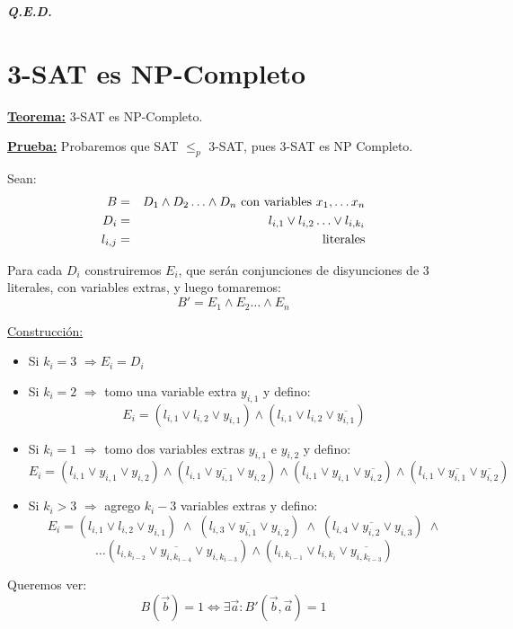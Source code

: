\documentclass[12pt,a4paper]{report}
\newcommand{\QED}{\hfill \textit{\textbf{Q.E.D.}}}
\begin{document}
		\QED

	\section{3-SAT es NP-Completo}
		\textbf{\underline{Teorema:}} 3-SAT es NP-Completo.

		\textbf{\underline{Prueba:}} Probaremos que SAT $\leq_{p}$ 3-SAT, pues 3-SAT es NP Completo.

			\vspace{3mm}
			\par Sean:
			\begin{eqnarray}
				\nonumber B &=& D_{1} \wedge D_{2} \dotsc \wedge D_{n} \textup{ con variables } x_{1}, \dotsc x_{n} \\
				\nonumber D_{i} &=& l_{i, 1} \vee l_{i, 2} \dotsc \vee l_{i, k_{i}} \\
				\nonumber l_{i, j} &=& \textup{literales}
			\end{eqnarray}
			\par Para cada $D_{i}$ construiremos $E_{i}$, que serán conjunciones de disyunciones de 3 literales, con variables extras, y luego tomaremos:
			\[ B' = E_{1} \wedge E_{2} \dotsc \wedge E_{n} \]

			\underline{Construcción:}
			\begin{itemize}
				\item Si \underline{$k_{i} = 3$} $\Rightarrow E_{i} = D_{i}$
				\item Si \underline{$k_{i} = 2$} $\Rightarrow$ tomo una variable extra $y_{i, 1}$ y defino:
					\[ E_{i} = (l_{i, 1} \vee l_{i, 2} \vee y_{i, 1}) \wedge (l_{i, 1} \vee l_{i, 2} \vee \overline{y_{i, 1}}) \]
				\item Si \underline{$k_{i} = 1$} $\Rightarrow$ tomo dos variables extras $y_{i, 1}$ e $y_{i, 2}$ y defino:
					\[ E_{i} = (l_{i, 1} \vee y_{i, 1} \vee y_{i, 2}) \wedge (l_{i, 1} \vee \overline{y_{i, 1}} \vee y_{i, 2}) \wedge (l_{i, 1} \vee y_{i, 1} \vee \overline{y_{i, 2}}) \wedge (l_{i, 1} \vee \overline{y_{i, 1}} \vee \overline{y_{i, 2}}) \]
				\item Si \underline{$k_{i} > 3$} $\Rightarrow$ agrego $k_{i} - 3$ variables extras y defino:
					\[ E_{i} = (l_{i, 1} \vee l_{i, 2} \vee y_{i, 1}) \; \wedge \; (l_{i, 3} \vee \overline{y_{i, 1}} \vee y_{i, 2}) \; \wedge \; (l_{i, 4} \vee \overline{y_{i, 2}} \vee y_{i, 3}) \; \wedge \]
					\[ \dotsc (l_{i, k_{i-2}} \vee \overline{y_{i, k_{i-4}}} \vee y_{i, k_{i-3}}) \wedge (l_{i, k_{i-1}} \vee l_{i, k_{i}} \vee \overline{y_{i, k_{i-3}}}) \]
			\end{itemize}
			\par Queremos ver:
			\[ B(\overrightarrow{b}) = 1 \Leftrightarrow \exists \overrightarrow{a} : B'(\overrightarrow{b}, \overrightarrow{a}) = 1 \]
\end{document}
